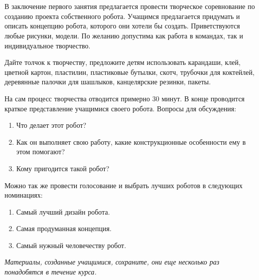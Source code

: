{\hypertarget{lesson1x5}{}}\\\\

В заключение первого занятия предлагается провести творческое соревнование по созданию проекта собственного робота. Учащимся предлагается придумать и описать концепцию робота, которого они хотели бы создать. Приветствуются любые рисунки, модели. По желанию допустима как работа в командах, так и индивидуальное творчество.

Дайте толчок к творчеству, предложите детям использовать карандаши, клей, цветной картон, пластилин, пластиковые бутылки, скотч, трубочки для коктейлей, деревянные палочки для шашлыков, канцелярские резинки, пакеты.

На сам процесс творчества отводится примерно 30 минут. В конце проводится краткое представление учащимися своего робота. Вопросы для обсуждения:

\begin{enumerate}
	\item Что делает этот робот?
	\item Как он выполняет свою работу, какие конструкционные особенности ему в этом помогают?
	\item Кому пригодится такой робот?
\end{enumerate}
Можно так же провести голосование и выбрать лучших роботов в следующих номинациях:

\begin{enumerate}
	\item Самый лучший дизайн робота.
	\item Самая продуманная концепция.
	\item Самый нужный человечеству робот.	
\end{enumerate}
{\slshape Материалы, созданные учащимися, сохраните, они еще несколько раз понадобятся в течение курса.}